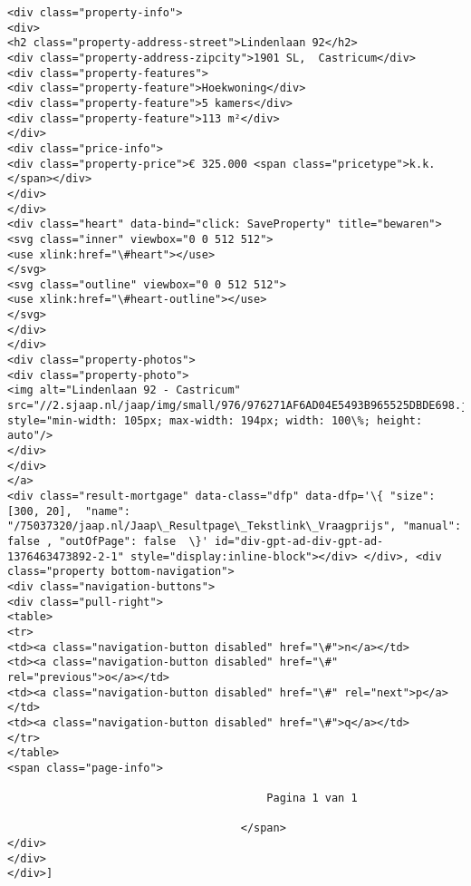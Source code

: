 \documentclass[11pt]{article}
\begin{document}
\begin{Verbatim}[commandchars=\\\{\}]
<div class="property-info">
<div>
<h2 class="property-address-street">Lindenlaan 92</h2>
<div class="property-address-zipcity">1901 SL,  Castricum</div>
<div class="property-features">
<div class="property-feature">Hoekwoning</div>
<div class="property-feature">5 kamers</div>
<div class="property-feature">113 m²</div>
</div>
<div class="price-info">
<div class="property-price">€ 325.000 <span class="pricetype">k.k.</span></div>
</div>
</div>
<div class="heart" data-bind="click: SaveProperty" title="bewaren">
<svg class="inner" viewbox="0 0 512 512">
<use xlink:href="\#heart"></use>
</svg>
<svg class="outline" viewbox="0 0 512 512">
<use xlink:href="\#heart-outline"></use>
</svg>
</div>
</div>
<div class="property-photos">
<div class="property-photo">
<img alt="Lindenlaan 92 - Castricum" src="//2.sjaap.nl/jaap/img/small/976/976271AF6AD04E5493B965525DBDE698.jpg" style="min-width: 105px; max-width: 194px; width: 100\%; height: auto"/>
</div>
</div>
</a>
<div class="result-mortgage" data-class="dfp" data-dfp='\{ "size": [300, 20],  "name": "/75037320/jaap.nl/Jaap\_Resultpage\_Tekstlink\_Vraagprijs", "manual": false , "outOfPage": false  \}' id="div-gpt-ad-div-gpt-ad-1376463473892-2-1" style="display:inline-block"></div> </div>, <div class="property bottom-navigation">
<div class="navigation-buttons">
<div class="pull-right">
<table>
<tr>
<td><a class="navigation-button disabled" href="\#">n</a></td>
<td><a class="navigation-button disabled" href="\#" rel="previous">o</a></td>
<td><a class="navigation-button disabled" href="\#" rel="next">p</a></td>
<td><a class="navigation-button disabled" href="\#">q</a></td>
</tr>
</table>
<span class="page-info">

                                        Pagina 1 van 1

                                    </span>
</div>
</div>
</div>]

    \end{Verbatim}
\end{document}
